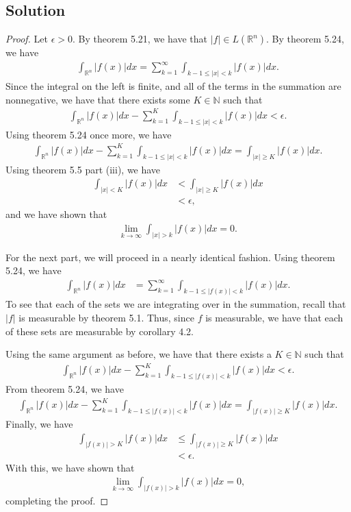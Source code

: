 \documentclass[10pt,a4paper]{article}
\theoremstyle{theorem}
\theoremstyle{definition}
\begin{document}
\subsection*{Solution}
\begin{proof}
Let $\epsilon > 0$. By theorem 5.21, we have that $|f| \in L(\mathbb{R}^n)$.  By theorem 5.24, we have
\begin{align*}
\int_{\mathbb{R}^n} |f(x)|dx = \sum_{k=1}^\infty \int_{k - 1 \leq |x| < k} |f(x)|dx.
\end{align*}
Since the integral on the left is finite, and all of the terms in the summation are nonnegative, we have that there exists some $K \in \mathbb{N}$ such that 
\begin{align*}
\int_{\mathbb{R}^n} |f(x)|dx - \sum_{k=1}^K \int_{k - 1 \leq |x| < k} |f(x)|dx < \epsilon.
\end{align*}
Using theorem 5.24 once more, we have 
\begin{align*}
\int_{\mathbb{R}^n} |f(x)|dx - \sum_{k=1}^K \int_{k - 1 \leq |x| < k} |f(x)|dx = \int_{ |x| \geq K} |f(x)|dx.
\end{align*}
Using theorem 5.5 part (iii), we have
\begin{align*}
\int_{ |x| < K} |f(x)|dx &< \int_{ |x| \geq K} |f(x)|dx\\
&< \epsilon,
\end{align*}
and we have shown that 
\begin{align*}
\lim_{k \to \infty} \int_{|x| > k} |f(x)|dx = 0.
\end{align*}

For the next part, we will proceed in a nearly identical fashion. Using theorem 5.24, we have
\begin{align*}
\int_{\mathbb{R}^n} |f(x)|dx &= \sum_{k=1}^\infty \int_{k - 1 \leq |f(x)| < k} |f(x)|dx.
\end{align*}
To see that each of the sets we are integrating over in the summation, recall that $|f|$ is measurable by theorem 5.1. Thus, since $f$ is measurable,  we have that each of these sets are measurable by corollary 4.2.

Using the same argument as before, we have that there exists a $K \in \mathbb{N}$ such that 
\begin{align*}
\int_{\mathbb{R}^n} |f(x)|dx - \sum_{k=1}^K \int_{k - 1 \leq |f(x)| < k} |f(x)|dx < \epsilon.
\end{align*}
From theorem 5.24, we have
\begin{align*}
\int_{\mathbb{R}^n} |f(x)|dx - \sum_{k=1}^K \int_{k - 1 \leq |f(x)| < k} |f(x)|dx = \int_{|f(x)| \geq K} |f(x)|dx.
\end{align*}
Finally, we have
\begin{align*}
\int_{|f(x)| > K} |f(x)|dx &\leq \int_{|f(x)| \geq K} |f(x)|dx\\
&< \epsilon.
\end{align*}
With this, we have shown that
\begin{align*}
\lim_{k \to \infty} \int_{|f(x)| > k} |f(x)|dx = 0,
\end{align*}
completing the proof.
\end{proof}
\end{document}

